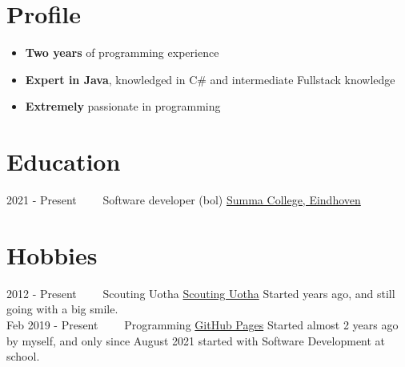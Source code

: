 \documentclass[letterpaper]{twentysecondcv} %
\begin{document}
    \makesidebarFirst %



    \section{Profile}

    \begin{itemize}
        \item \textbf{Two years} of programming experience
        \item \textbf{Expert in Java}, knowledged in C\# and intermediate Fullstack knowledge
        \item \textbf{Extremely} passionate in programming
    \end{itemize}

    \vspace{6mm}




    \section{Education}

    \begin{twenty} %
        \twentyitem
        {2021 - Present~~~~}
        {}
        {Software developer (bol)}
        {\href{https://www.summacollege.nl/}{Summa College, Eindhoven}}
        {}
        {}
    \end{twenty}



    \section{Hobbies}

    \begin{twenty} %
        \twentyitem
        {2012 -}
        {Present~~~~}
        {Scouting Uotha}
        {\href{https://www.uotha.nl/}{Scouting Uotha}}
        {}
        { Started years ago, and still going with a big smile.}\\
        \twentyitem
        {Feb 2019 -}
        {Present~~~~}
        {Programming}
        {\href{https://tais993.github.io/}{GitHub Pages}}
        {}
        {Started almost 2 years ago by myself, and only since August 2021 started with Software Development at school.}
    \end{twenty}
\end{document}
